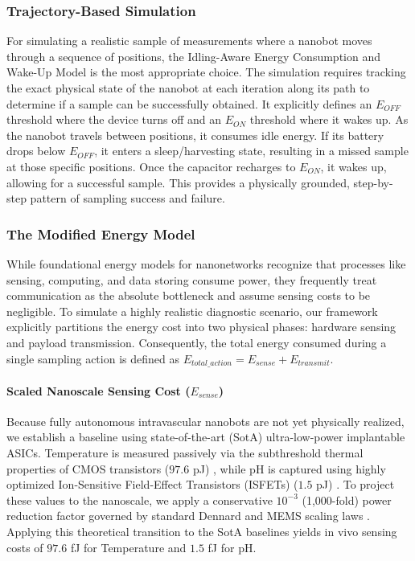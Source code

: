 \documentclass[sigconf]{acmart}
\begin{document}
\subsubsection{Trajectory-Based Simulation}
For simulating a realistic sample of measurements where a nanobot moves through a sequence of positions, the Idling-Aware Energy Consumption and Wake-Up Model is the most appropriate choice. The simulation requires tracking the exact physical state of the nanobot at each iteration along its path to determine if a sample can be successfully obtained. It explicitly defines an $E_{OFF}$ threshold where the device turns off and an $E_{ON}$ threshold where it wakes up. As the nanobot travels between positions, it consumes idle energy. If its battery drops below $E_{OFF}$, it enters a sleep/harvesting state, resulting in a missed sample at those specific positions. Once the capacitor recharges to $E_{ON}$, it wakes up, allowing for a successful sample. This provides a physically grounded, step-by-step pattern of sampling success and failure.

\subsubsection{The Modified Energy Model}
While foundational energy models for nanonetworks recognize that processes like sensing, computing, and data storing consume power, they frequently treat communication as the absolute bottleneck and assume sensing costs to be negligible. To simulate a highly realistic diagnostic scenario, our framework explicitly partitions the energy cost into two physical phases: hardware sensing and payload transmission. Consequently, the total energy consumed during a single sampling action is defined as $E_{total\_action} = E_{sense} + E_{transmit}$.

\paragraph{Scaled Nanoscale Sensing Cost ($E_{sense}$)} Because fully autonomous intravascular nanobots are not yet physically realized, we establish a baseline using state-of-the-art (SotA) ultra-low-power implantable ASICs. Temperature is measured passively via the subthreshold thermal properties of CMOS transistors ($97.6$ pJ) \cite{jayaram2024cmos}, while pH is captured using highly optimized Ion-Sensitive Field-Effect Transistors (ISFETs) ($1.5$ pJ) \cite{moser2016isfets}. To project these values to the nanoscale, we apply a conservative $10^{-3}$ (1,000-fold) power reduction factor governed by standard Dennard and MEMS scaling laws \cite{dennard1974design, iwai2018impact}. Applying this theoretical transition to the SotA baselines yields in vivo sensing costs of $97.6$ fJ for Temperature and $1.5$ fJ for pH.
\end{document}
